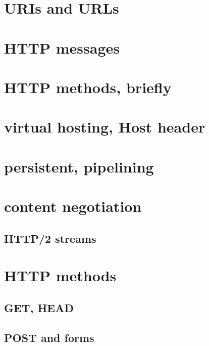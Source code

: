 \date{}
\title{}
\date{}

\begin{frame}
    \titlepage
\end{frame}

\section{URIs and URLs}


\section{HTTP messages}


\section{HTTP methods, briefly}


\section{virtual hosting, Host header}


\section{persistent, pipelining}

\section{content negotiation}

\subsection{HTTP/2 streams}

\section{HTTP methods}

\subsection{GET, HEAD}

\subsection{POST and forms}

